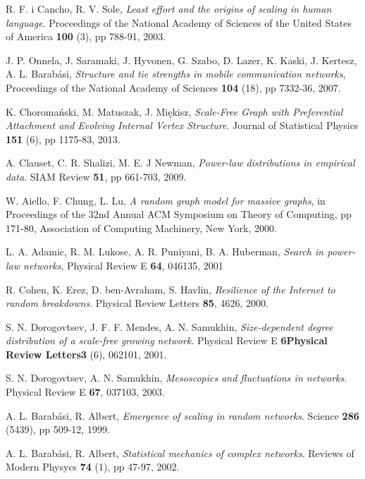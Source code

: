 \begin{thebibliography}{99}
  R. F. i Cancho, R. V. Sole,
  \emph{Least effort and the origins of scaling in human language}.
  Proceedings of the National Academy of Sciences of the United States of America \textbf{100} (3), pp 788-91,
  2003.

  J. P. Onnela, J. Saramaki, J. Hyvonen, G. Szabo, D. Lazer, K. Kaski, J. Kertesz, A. L. Barabási,
  \emph{Structure and tie strengths in mobile communication networks},
  Proceedings of the National Academy of Sciences \textbf{104} (18), pp 7332-36,
  2007.

  K. Choromański, M. Matuszak, J. Miękisz,
  \emph{Scale-Free Graph with Preferential Attachment and Evolving Internal Vertex Structure}.
  Journal of Statistical Physics \textbf{151} (6), pp 1175-83,
  2013.

  A. Clauset, C. R. Shalizi, M. E. J Newman,
  \emph{Power-law distributions in empirical data}.
  SIAM Review \textbf{51}, pp 661-703,
  2009.

  W. Aiello, F. Chung, L. Lu,
  \emph{A random graph model for massive graphs},
  in Proceedings of the 32nd Annual ACM Symposium on Theory of Computing, pp 171-80,
  Association of Computing Machinery, New York,
  2000.

  L. A. Adamic, R. M. Lukose, A. R. Puniyani, B. A. Huberman,
  \emph{Search in power-law networks},
  Physical Review E \textbf{64}, 046135,
  2001

  R. Cohen, K. Erez, D. ben-Avraham, S. Havlin,
  \emph{Resilience of the Internet to random breakdowns}.
  Physical Review Letters \textbf{85}, 4626,
  2000.

  S. N. Dorogovtsev, J. F. F. Mendes, A. N. Samukhin,
  \emph{Size-dependent degree distribution of a scale-free growing network}.
  Physical Review E \textbf{6Physical Review Letters3} (6), 062101,
  2001.

  S. N. Dorogovtsev, A. N. Samukhin,
  \emph{Mesoscopics and fluctuations in networks}.
  Physical Review E \textbf{67}, 037103,
  2003.

  A. L. Barabási, R. Albert,
  \emph{Emergence of scaling in random networks}.
  Science \textbf{286} (5439), pp 509-12,
  1999.

  A. L. Barabási, R. Albert,
  \emph{Statistical mechanics of complex networks}.
  Reviews of Modern Physycs \textbf{74} (1), pp 47-97,
  2002.
  

\end{thebibliography}
